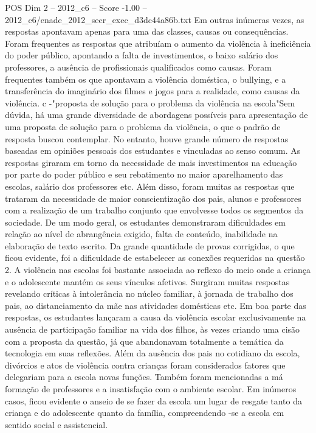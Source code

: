 \begin{textsample}{POS Dim 2 – 2012\_c6 – Score -1.00 – 2012\_c6/enade\_2012\_secr\_exec\_d3dc44a86b.txt}
Em outras inúmeras vezes, as respostas apontavam apenas para uma das classes, causas ou consequências.
Foram frequentes as respostas que atribuíam o aumento da violência à ineficiência do poder público, apontando a falta de investimentos, o baixo salário dos professores, a ausência de profissionais qualificados como causas.
Foram frequentes também os que apontavam a violência doméstica, o bullying, e a transferência do imaginário dos filmes e jogos para a realidade, como causas da violência. c -"proposta de solução para o problema da violência na escola"Sem dúvida, há uma grande diversidade de abordagens possíveis para apresentação de uma proposta de solução para o problema da violência, o que o padrão de resposta buscou contemplar.
No entanto, houve grande número de respostas baseadas em opiniões pessoais dos estudantes e vinculadas ao senso comum.
As respostas giraram em torno da necessidade de mais investimentos na educação por parte do poder público e seu rebatimento no maior aparelhamento das escolas, salário dos professores etc.
Além disso, foram muitas as respostas que trataram da necessidade de maior conscientização dos pais, alunos e professores com a realização de um trabalho conjunto que envolvesse todos os segmentos da sociedade.
De um modo geral, os estudantes demonstraram dificuldades em relação ao nível de abrangência exigido, falta de conteúdo, inabilidade na elaboração de texto escrito.
Da grande quantidade de provas corrigidas, o que ficou evidente, foi a dificuldade de estabelecer as conexões requeridas na questão 2.
A violência nas escolas foi bastante associada ao reflexo do meio onde a criança e o adolescente mantém os seus vínculos afetivos.
Surgiram muitas respostas revelando críticas à intolerância no núcleo familiar, à jornada de trabalho dos pais, ao distanciamento da mãe nas atividades domésticas etc.
Em boa parte das respostas, os estudantes lançaram a causa da violência escolar exclusivamente na ausência de participação familiar na vida dos filhos, às vezes criando uma cisão com a proposta da questão, já que abandonavam totalmente a temática da tecnologia em suas reflexões.
Além da ausência dos pais no cotidiano da escola, divórcios e atos de violência contra crianças foram considerados fatores que delegariam para a escola novas funções.
Também foram mencionadas a má formação de professores e a insatisfação com o ambiente escolar.
Em inúmeros casos, ficou evidente o anseio de se fazer da escola um lugar de resgate tanto da criança e do adolescente quanto da família, compreendendo -se a escola em sentido social e assistencial.

\end{textsample}
